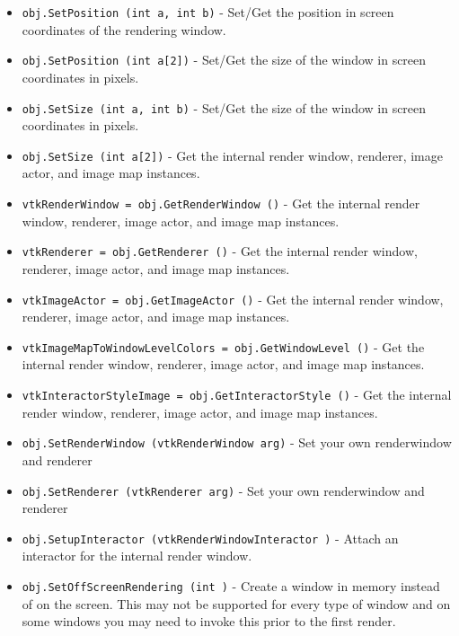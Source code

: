 \begin{itemize}
\item  \verb|obj.SetPosition (int a, int b)| -  Set/Get the position in screen coordinates of the rendering window.

\item  \verb|obj.SetPosition (int a[2])| -  Set/Get the size of the window in screen coordinates in pixels.

\item  \verb|obj.SetSize (int a, int b)| -  Set/Get the size of the window in screen coordinates in pixels.

\item  \verb|obj.SetSize (int a[2])| -  Get the internal render window, renderer, image actor, and
 image map instances.

\item  \verb|vtkRenderWindow = obj.GetRenderWindow ()| -  Get the internal render window, renderer, image actor, and
 image map instances.

\item  \verb|vtkRenderer = obj.GetRenderer ()| -  Get the internal render window, renderer, image actor, and
 image map instances.

\item  \verb|vtkImageActor = obj.GetImageActor ()| -  Get the internal render window, renderer, image actor, and
 image map instances.

\item  \verb|vtkImageMapToWindowLevelColors = obj.GetWindowLevel ()| -  Get the internal render window, renderer, image actor, and
 image map instances.

\item  \verb|vtkInteractorStyleImage = obj.GetInteractorStyle ()| -  Get the internal render window, renderer, image actor, and
 image map instances.

\item  \verb|obj.SetRenderWindow (vtkRenderWindow arg)| -  Set your own renderwindow and renderer

\item  \verb|obj.SetRenderer (vtkRenderer arg)| -  Set your own renderwindow and renderer

\item  \verb|obj.SetupInteractor (vtkRenderWindowInteractor )| -  Attach an interactor for the internal render window.

\item  \verb|obj.SetOffScreenRendering (int )| -  Create a window in memory instead of on the screen. This may not
 be supported for every type of window and on some windows you may
 need to invoke this prior to the first render.


\end{itemize}
